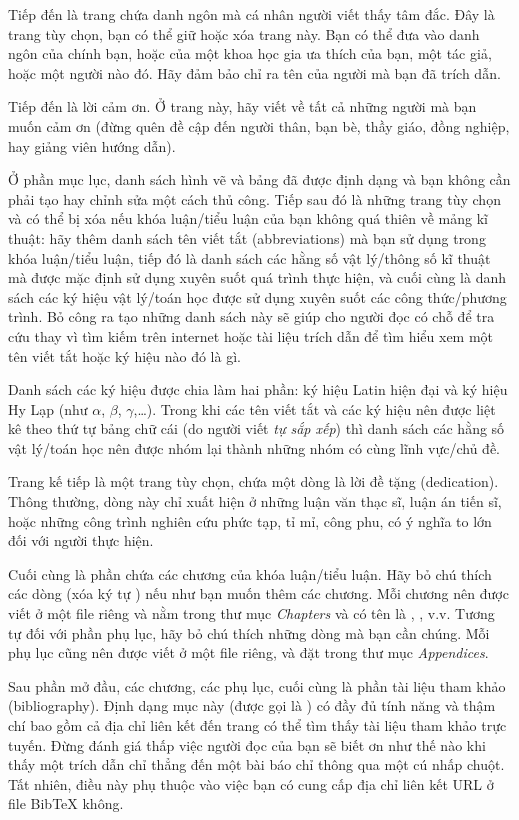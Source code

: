 Tiếp đến là trang chứa danh ngôn mà cá nhân người viết thấy tâm đắc. Đây là trang tùy chọn, bạn có thể giữ hoặc xóa trang này. Bạn có thể đưa vào danh ngôn của chính bạn, hoặc của một khoa học gia ưa thích của bạn, một tác giả, hoặc một người nào đó. Hãy đảm bảo chỉ ra tên của người mà bạn đã trích dẫn.

Tiếp đến là lời cảm ơn. Ở trang này, hãy viết về tất cả những người mà bạn muốn cảm ơn (đừng quên đề cập đến người thân, bạn bè, thầy giáo, đồng nghiệp, hay giảng viên hướng dẫn).

Ở phần mục lục, danh sách hình vẽ và bảng đã được định dạng và bạn không cần phải tạo hay chỉnh sửa một cách thủ công. Tiếp sau đó là những trang tùy chọn và có thể bị xóa nếu khóa luận/tiểu luận của bạn không quá thiên về mảng kĩ thuật: hãy thêm danh sách tên viết tắt (abbreviations) mà bạn sử dụng trong khóa luận/tiểu luận, tiếp đó là danh sách các hằng số vật lý/thông số kĩ thuật mà được mặc định sử dụng xuyên suốt quá trình thực hiện, và cuối cùng là danh sách các ký hiệu vật lý/toán học được sử dụng xuyên suốt các công thức/phương trình. Bỏ công ra tạo những danh sách này sẽ giúp cho người đọc có chỗ để tra cứu thay vì tìm kiếm trên internet hoặc tài liệu trích dẫn để tìm hiểu xem một tên viết tắt hoặc ký hiệu nào đó là gì.

Danh sách các ký hiệu được chia làm hai phần: ký hiệu Latin hiện đại và ký hiệu Hy Lạp (như $\alpha$, $\beta$, $\gamma$,\ldots). Trong khi các tên viết tắt và các ký hiệu nên được liệt kê theo thứ tự bảng chữ cái (do người viết \emph{tự sắp xếp}) thì danh sách các hằng số vật lý/toán học nên được nhóm lại thành những nhóm có cùng lĩnh vực/chủ đề.

Trang kế tiếp là một trang tùy chọn, chứa một dòng là lời đề tặng (dedication). Thông thường, dòng này chỉ xuất hiện ở những luận văn thạc sĩ, luận án tiến sĩ, hoặc những công trình nghiên cứu phức tạp, tỉ mỉ, công phu, có ý nghĩa to lớn đối với người thực hiện.

Cuối cùng là phần chứa các chương của khóa luận/tiểu luận. Hãy bỏ chú thích các dòng (xóa ký tự \code{\%}) nếu như bạn muốn thêm các chương. Mỗi chương nên được viết ở một file riêng và nằm trong thư mục \emph{Chapters} và có tên là , , v.v. Tương tự đối với phần phụ lục, hãy bỏ chú thích những dòng mà bạn cần chúng. Mỗi phụ lục cũng nên được viết ở một file riêng, và đặt trong thư mục \emph{Appendices}.

Sau phần mở đầu, các chương, các phụ lục, cuối cùng là phần tài liệu tham khảo (bibliography). Định dạng mục này (được gọi là ) có đầy đủ tính năng và thậm chí bao gồm cả địa chỉ liên kết đến trang có thể tìm thấy tài liệu tham khảo trực tuyến. Đừng đánh giá thấp việc người đọc của bạn sẽ biết ơn như thế nào khi thấy một trích dẫn chỉ thẳng đến một bài báo chỉ thông qua một cú nhấp chuột. Tất nhiên, điều này phụ thuộc vào việc bạn có cung cấp địa chỉ liên kết URL ở file BibTeX không.


